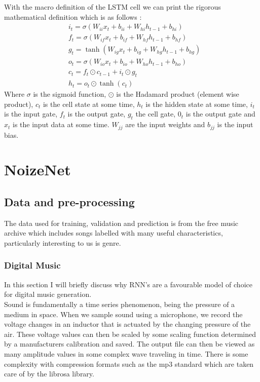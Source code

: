 \documentclass{article}
\begin{document}
With the macro definition of the LSTM cell we can print the rigorous mathematical definition which is as follows \cite{LSTM}\cite{sak_senior_beaufays_2014}:
\begin{align*}
&i_t = \sigma\left(W_{ii}x_t + b_{ii} + W_{hi}h_{t-1} + b_{hi} \right) \\
&f_t = \sigma\left(W_{if}x_t + b_{if} + W_{hf}h_{t-1} + b_{hf} \right) \\
&g_t = \tanh\left(W_{ig}x_t + b_{ig} + W_{hg}h_{t-1} + b_{hg} \right) \\
&o_t = \sigma\left(W_{io}x_t + b_{io} + W_{ho}h_{t-1} + b_{ho} \right) \\
&c_t = f_t \odot c_{t-1} + i_t \odot g_t \\
&h_t = o_t \odot \tanh(c_t)
\end{align*}
Where $\sigma$ is the sigmoid function, $\odot$ is the Hadamard product (element wise product), $c_t$ is the cell state at some time, $h_t$ is the hidden state at some time, $i_t$ is the input gate, $f_t$ is the output gate, $g_t$ the cell gate, $0_t$ is the output gate and $x_t$ is the input data at some time. $W_{jj}$ are the input weights and $b_{jj}$ is the input bias. 
\section{NoizeNet}
\label{sec:nn}
\subsection{Data and pre-processing}
The data used for training, validation and prediction is from the free music archive which includes songs labelled with many useful characteristics, particularly interesting to us is genre.  \cite{fma_dataset}
\cite{fma_challenge}
\subsubsection{Digital Music}
In this section I will briefly discuss why RNN's are a favourable model of choice for digital music generation. \\
Sound is fundamentally a time series phenomenon, being the pressure of a medium in space. When we sample sound using a microphone, we record the voltage changes in an inductor that is actuated by the changing pressure of the air. These voltage values can then be scaled by some scaling function determined by a manufacturers calibration and saved. The output file can then be viewed as many amplitude values in some complex wave traveling in time. There is some complexity with compression formats such as the mp3 standard which are taken care of by the librosa library. \cite{isoMP3}
\end{document}
